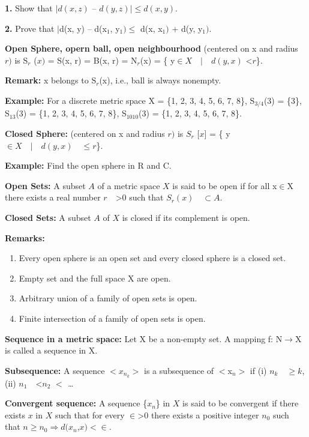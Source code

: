 \documentclass[12pt]{amsart}
\begin{document}
\textbf{1.} Show that $\vert d (x, z)$ -- $d (y, z)\vert \leqslant d (x, y)$.

\textbf{2.} Prove that $\vert $d(x, y) -- d(x$_{1}$, y$_{1})\leqslant $ 
d(x, x$_{1})$ + d(y, y$_{1})$.

\textbf{Open Sphere, opern ball, open neighbourhood} (centered on x and 
radius $r )$ is  S$_{r}$ ($x)$ = S(x, r) = B(x, r) = N$_{r}$(x) = {\{} y$\in X \quad \vert 
 \quad d (y, x)$ <$ r ${\}}.

\textbf{Remark:} x belongs to S$_{r}$(x), i.e., ball is always nonempty.

\textbf{Example:} For a discrete metric space X = {\{}1, 2, 3, 4, 5, 6, 7, 
8{\}}, S$_{3/4}$(3) = {\{}3{\}}, S$_{13}$(3) = {\{}1, 2, 3, 4, 5, 6, 7, 
8{\}}, S$_{1010}$(3) = {\{}1, 2, 3, 4, 5, 6, 7, 8{\}}.

\textbf{Closed Sphere:} (centered on x and radius $r )$ is  $S_{r}$ [$x$] = {\{} y$\in 
X \quad \vert  \quad d (y, x) \quad \leqslant r ${\}}.

\textbf{Example:} Find the open sphere in R and C. 

\textbf{Open Sets:} A subset $A$ of a metric space $X$ is said to be open if for 
all x$\in $X there exists a real number $r \quad $>$ 0$ such that $S_{r}(x) \quad \subset A.$

\textbf{Closed Sets:} A subset $A$ of $X$ is closed if its complement is open.

\textbf{Remarks:}

\begin{enumerate}
\item Every open sphere is an open set and every closed sphere is a closed set. 
\item Empty set and the full space X are open. 
\item Arbitrary union of a family of open sets is open. 
\item Finite intersection of a family of open sets is open.
\end{enumerate}
\textbf{Sequence in a metric space:} Let X be a non-empty set. A mapping f: 
N$\to $X is called a sequence in X.

\textbf{Subsequence:} A sequence $<x_{n_k } >$ is a subsequence of 
$<$x$_{n}>$ if (i) $n_{k} \quad \geqslant k$, (ii) $n_{1} \quad $<$ n_{2}$ \textit{$<$ {\ldots}}

\textbf{Convergent sequence:} A sequence {\{}$x_{n}${\}} in $X$ is said to be 
convergent if there exists $x$ in $X$ such that for every $\in $>$0$ there exists a 
positive integer $n_{0}$ such that $n\geqslant n_{0 }\Rightarrow 
d(x_{n}$,$x)<\in $.
\end{document}
